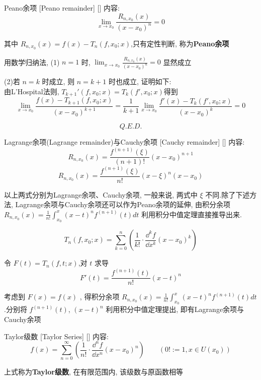 \documentclass[UTF8]{ctexart}
\begin{document}
			\begin{thm}
			    []
			    {Peano余项}
			    [Peano remainder]
			    []
				内容: 
				\[\lim_{x\to x_0}\frac{R_{n,x_0}(x)}{(x-x_0)^n}=0\]

				其中 \(R_{n,x_0}(x)=f(x)-T_n(f,x_0;x)\),只有定性判断, 称为\textbf{Peano余项}
			\end{thm}
				
			\begin{prf}
				
				用数学归纳法,  (1) \(n=1\) 时, \(\lim_{x\to x_0}\frac{R_{n,x_0}(x)}{(x-x_0)^n}=0\) 显然成立

				(2)若 \(n=k\) 时成立, 则 \(n=k+1\) 时也成立, 证明如下: \\
				由L'Hospital法则, \(T_{k+1}'(f,x_0;x)=T_k(f',x_0;x)\)得到
				\[\lim_{x\to x_0}\frac{f(x)-T_{k+1}(f,x_0;x)}{(x-x_0)^{k+1}}=\frac{1}{k+1}\lim_{x\to x_0}\frac{f'(x)-T_k(f',x_0;x)}{(x-x_0)^k}=0\]

				\[Q.E.D.\]

			\end{prf}

			\begin{thm}
			    []
			    {Lagrange余项(Lagrange remainder)与Cauchy余项}
			    [Cauchy remainder]
			    []
				内容: 
				\[R_{n,x_0}(x)=\frac{f^{(n+1)}(\xi)}{(n+1)!}(x-x_0)^{n+1}\]
				\[R_{n,x_0}(x)=\frac{f^{(n+1)}(\xi)}{n!}(x-\xi)^n(x-x_0)\]

				以上两式分别为Lagrange余项、Cauchy余项, 一般来说, 两式中 \(\xi\) 不同.除了下述方法, Lagrange余项与Cauchy余项还可以作为Peano余项的延伸, 由积分余项 \(R_{n,x_0}(x)=\frac{1}{n!}\int_{x_0}^{x}(x-t)^nf^{(n+1)}(t)dt\) 利用积分中值定理直接推导出来.
			\end{thm}

			\begin{prf}

				\[T_n(f,x_0;x)=\sum_{k=0}^n\left(\frac{1}{k!}\cdot\frac{\dd^k f}{\dd x^k}(x-x_0)^k\right)\]

				令 \(F(t)=T_n(f,t;x)\),对 \(t\) 求导
				\[F'(t)=\frac{f^{(n+1)}(t)}{n!}(x-t)^n\]

				考虑到 \(F(x)=f(x)\) , 得积分余项 \(R_{n,x_0}(x)=\frac{1}{n!}\int_{x_0}^{x}(x-t)^nf^{(n+1)}(t)dt\).分别将 \(f^{(n+1)}(t)\), \((x-t)^n\) 利用积分中值定理提出, 即有Lagrange余项与Cauchy余项

			\end{prf}

			\begin{dfn}
			    []
			    {Taylor级数}
			    [Taylor Series]
			    []
				内容: 
				\[f(x)=\sum_{n=0}^{\infty}\left(\frac{1}{n!}\cdot\frac{\dd^n f}{\dd x^n}(x-x_0)^n\right)\qquad(0!:=1, x\in U(x_0))\]
				
				上式称为\textbf{Taylor级数}, 在有限范围内, 该级数与原函数相等
			\end{dfn}
				
\end{document}
